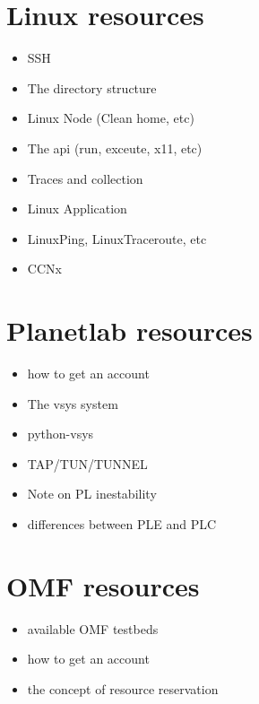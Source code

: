 %
%
%
%
%
%

\section{Linux resources}

\begin{itemize}
  \item SSH
  \item The directory structure
  \item Linux Node (Clean home, etc)
  \item The api (run, exceute, x11, etc)
  \item Traces and collection
  \item Linux Application
  \item LinuxPing, LinuxTraceroute, etc
  \item CCNx
\end{itemize}

\section{Planetlab resources}

\begin{itemize}
 \item how to get an account
 \item The vsys system
 \item python-vsys
 \item TAP/TUN/TUNNEL
 \item Note on PL inestability
 \item differences between PLE and PLC
\end{itemize}

\section{OMF resources}

\begin{itemize}
  \item available OMF testbeds
  \item how to get an account
  \item the concept of resource reservation
\end{itemize}
